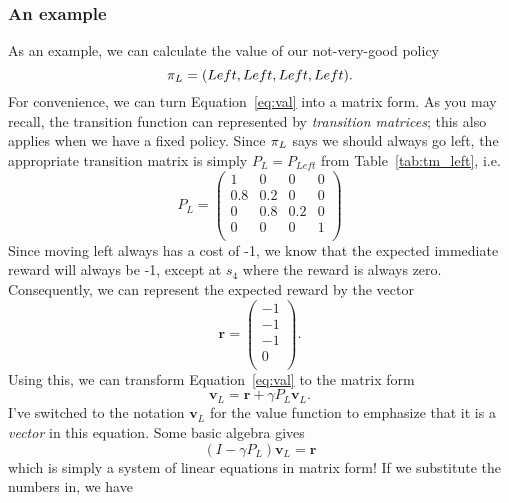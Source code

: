 \documentclass[a4paper]{article}
\begin{document}
\subsubsection{An example}
As an example, we can calculate the value of our not-very-good policy
\begin{equation*}
  \pi_L = (Left, Left, Left, Left) .
\end{equation*}
For convenience, we can turn Equation~\ref{eq:val} into a matrix form.
As you may recall, the transition function can represented by
\emph{transition matrices};
this also applies when we have a fixed policy.
Since $\pi_L$ says we should always go left, the appropriate transition
matrix is simply $P_L = P_{Left}$ from Table~\ref{tab:tm_left}, i.e.
\begin{equation*}
  P_L =
  \begin{pmatrix}
      1   & 0   & 0   & 0 \\
      0.8 & 0.2 & 0   & 0 \\
      0   & 0.8 & 0.2 & 0 \\
      0   & 0   & 0   & 1 \\
  \end{pmatrix}
\end{equation*}
Since moving left always has a cost of -1, we know that the expected
immediate reward will always be -1, except at $s_4$ where the reward
is always zero.
Consequently, we can represent the expected reward by the vector
\begin{equation*}
  \mathbf{r} = \begin{pmatrix}
    -1 \\ -1 \\ -1 \\ 0 \\
  \end{pmatrix} .
\end{equation*}
Using this, we can transform Equation~\ref{eq:val} to the matrix form
\begin{equation} \label{eq:val_matrix}
  \mathbf{v}_L = \mathbf{r} + \gamma P_L \mathbf{v}_L .
\end{equation}
I've switched to the notation $\mathbf{v}_L$ for the value function to
emphasize that it is a \emph{vector} in this equation.
Some basic algebra gives
\begin{equation*}
  (I - \gamma P_L) \mathbf{v}_L = \mathbf{r}
\end{equation*}
which is simply a system of linear equations in matrix form!
If we substitute the numbers in, we have
\end{document}
